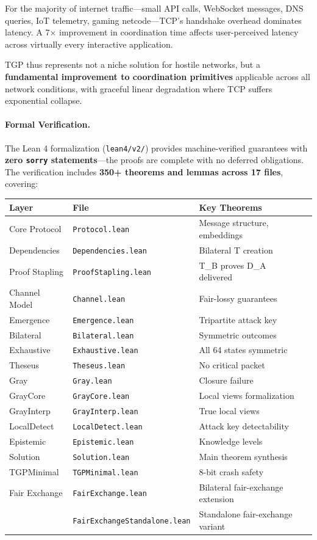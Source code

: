 For the majority of internet traffic---small API calls, WebSocket messages, DNS queries, IoT telemetry, gaming netcode---TCP's handshake overhead dominates latency. A 7$\times$ improvement in coordination time affects user-perceived latency across virtually every interactive application.

TGP thus represents not a niche solution for hostile networks, but a \textbf{fundamental improvement to coordination primitives} applicable across all network conditions, with graceful linear degradation where TCP suffers exponential collapse.

\paragraph{Formal Verification.}
The Lean 4 formalization (\texttt{lean4/v2/}) provides machine-verified guarantees with \textbf{zero \texttt{sorry} statements}---the proofs are complete with no deferred obligations. The verification includes \textbf{350+ theorems and lemmas across 17 files}, covering:

\begin{center}
\begin{tabular}{llll}
\toprule
\textbf{Layer} & \textbf{File} & \textbf{Key Theorems} \\
\midrule
Core Protocol & \texttt{Protocol.lean} & Message structure, embeddings \\
Dependencies & \texttt{Dependencies.lean} & Bilateral T creation \\
Proof Stapling & \texttt{ProofStapling.lean} & T\_B proves D\_A delivered \\
Channel Model & \texttt{Channel.lean} & Fair-lossy guarantees \\
Emergence & \texttt{Emergence.lean} & Tripartite attack key \\
Bilateral & \texttt{Bilateral.lean} & Symmetric outcomes \\
Exhaustive & \texttt{Exhaustive.lean} & All 64 states symmetric \\
Theseus & \texttt{Theseus.lean} & No critical packet \\
Gray & \texttt{Gray.lean} & Closure failure \\
GrayCore & \texttt{GrayCore.lean} & Local views formalization \\
GrayInterp & \texttt{GrayInterp.lean} & True local views \\
LocalDetect & \texttt{LocalDetect.lean} & Attack key detectability \\
Epistemic & \texttt{Epistemic.lean} & Knowledge levels \\
Solution & \texttt{Solution.lean} & Main theorem synthesis \\
TGPMinimal & \texttt{TGPMinimal.lean} & 8-bit crash safety \\
Fair Exchange & \texttt{FairExchange.lean} & Bilateral fair-exchange extension \\
 & \texttt{FairExchangeStandalone.lean} & Standalone fair-exchange variant \\
\bottomrule
\end{tabular}
\end{center}

